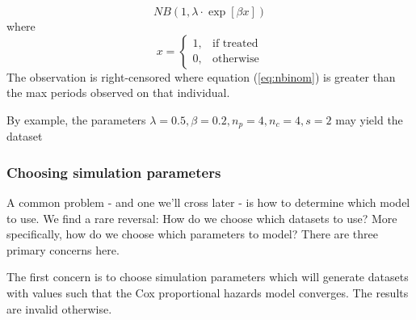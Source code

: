 
%
\begin{equation}
\label{eq:nbinom}
NB(1, \lambda \cdot \exp[\beta x])
\end{equation}
%
where
%
$$
  x=\begin{cases}
    1, & \text{if treated}\\
    0, & \text{otherwise}
  \end{cases}
$$
%
The observation is right-censored where equation (\ref{eq:nbinom}) is greater than the max periods observed on that individual.

By example, the parameters $\lambda=0.5, \beta=0.2, n_p=4, n_c=4, s=2$ may yield the dataset


\pgfplotsset{compat=newest}
\mytable
\pgfplotstabletypeset[fixed, %
precision=1, %
dec sep align %
]{\mytable}

\subsubsection{Choosing simulation parameters}

A common problem - and one we'll cross later - is how to determine which model to use. We find a rare reversal: How do we choose which datasets to use? More specifically, how do we choose which parameters to model? There are three primary concerns here.

The first concern is to choose simulation parameters which will generate datasets with values such that the Cox proportional hazards model converges. The results are invalid otherwise. 

